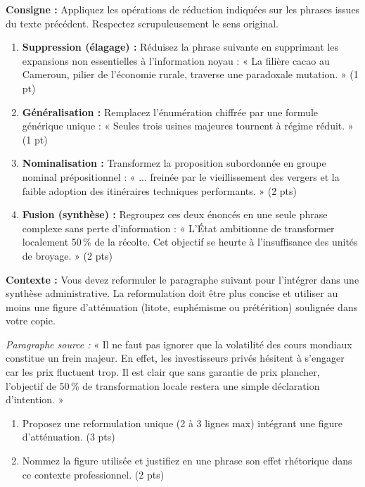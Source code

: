 \documentclass[11pt]{article}
\begin{document}
\begin{exercice}
\textbf{Consigne :} Appliquez les opérations de réduction indiquées sur les phrases issues du texte précédent. Respectez scrupuleusement le sens original.

\begin{enumerate}
    \item \textbf{Suppression (élagage) :} Réduisez la phrase suivante en supprimant les expansions non essentielles à l'information noyau : « La filière cacao au Cameroun, pilier de l'économie rurale, traverse une paradoxale mutation. » (1 pt)
    \item \textbf{Généralisation :} Remplacez l'énumération chiffrée par une formule générique unique : « Seules trois usines majeures tournent à régime réduit. » (1 pt)
    \item \textbf{Nominalisation :} Transformez la proposition subordonnée en groupe nominal prépositionnel : « ... freinée par le vieillissement des vergers et la faible adoption des itinéraires techniques performants. » (2 pts)
    \item \textbf{Fusion (synthèse) :} Regroupez ces deux énoncés en une seule phrase complexe sans perte d'information : « L'État ambitionne de transformer localement 50\,\% de la récolte. Cet objectif se heurte à l'insuffisance des unités de broyage. » (2 pts)
\end{enumerate}
\end{exercice}

\begin{exercice}
\textbf{Contexte :} Vous devez reformuler le paragraphe suivant pour l'intégrer dans une synthèse administrative. La reformulation doit être plus concise et utiliser au moins une figure d'atténuation (litote, euphémisme ou prétérition) soulignée dans votre copie.

\textit{Paragraphe source :} « Il ne faut pas ignorer que la volatilité des cours mondiaux constitue un frein majeur. En effet, les investisseurs privés hésitent à s'engager car les prix fluctuent trop. Il est clair que sans garantie de prix plancher, l'objectif de 50\,\% de transformation locale restera une simple déclaration d'intention. »

\begin{enumerate}
    \item Proposez une reformulation unique (2 à 3 lignes max) intégrant une figure d'atténuation. (3 pts)
    \item Nommez la figure utilisée et justifiez en une phrase son effet rhétorique dans ce contexte professionnel. (2 pts)
\end{enumerate}
\end{exercice}
\end{document}
